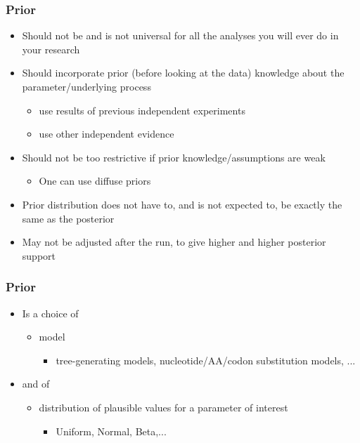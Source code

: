 \begin{frame}\frametitle{Prior}
	\begin{itemize}
		\item Should not be and is not universal for all the analyses you will ever do in your research 
		\item Should incorporate prior (before looking at the data) knowledge about the parameter/underlying process
		\begin{itemize}
			\item use results of previous independent experiments
			\item use other independent evidence
		\end{itemize}
		\item Should not be too restrictive if prior knowledge/assumptions are weak
		\begin{itemize}
			\item One can use diffuse priors
		\end{itemize}
		\item Prior distribution does not have to, and is not expected to, be exactly the same as the posterior
		\item May not be adjusted after the run, to give higher and higher posterior support
	\end{itemize}
\end{frame}

\begin{frame}\frametitle{Prior}
	\begin{itemize}
		\item Is a choice of 
		\begin{itemize}
			\item model 
			\begin{itemize}
				\item tree-generating models, nucleotide/AA/codon substitution models, ...
			\end{itemize}
		\end{itemize}
		\item[] and of 
		\begin{itemize}
			\item distribution of plausible values for a parameter of interest
			\begin{itemize}
				\item Uniform, Normal, Beta,...
			\end{itemize}
		\end{itemize}
	\end{itemize}
\end{frame}

